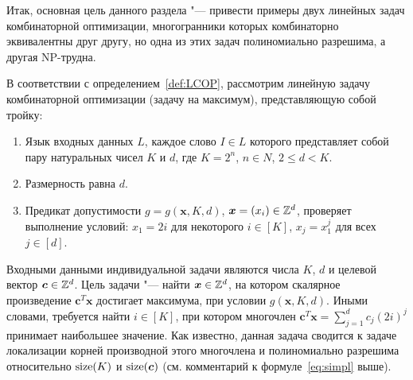 
Итак, основная цель данного раздела "--- привести примеры двух линейных задач комбинаторной оптимизации, %
многогранники которых комбинаторно эквивалентны друг другу, но одна из этих задач полиномиально разрешима, а другая NP-трудна.

В соответствии с определением~\ref{def:LCOP}, рассмотрим линейную задачу комбинаторной оптимизации (задачу на максимум), представляющую собой тройку:
\begin{enumerate}
	\item Язык входных данных $L$, каждое слово $I \in L$ которого представляет собой пару натуральных чисел $K$ и $d$, где $K = 2^n$, $n \in N$, $2 \le d < K$.
	\item Размерность равна $d$.
	\item Предикат допустимости $g = g(\bm{x},K,d)$, $\bm{x} = (x_i) \in \mathbb{Z}^d$, проверяет выполнение условий: $x_1 = 2i$ для некоторого $i \in [K]$, $x_j = x_1^j$ для всех $j \in [d]$.
\end{enumerate}

Входными данными индивидуальной задачи являются числа $K$, $d$ и целевой вектор $\bm{c} \in \mathbb{Z}^d$. Цель задачи "--- найти $\bm{x} \in \mathbb{Z}^d$, на котором скалярное произведение $\bm{c}^T \bm{x}$ достигает максимума, при условии $g(\bm{x},K,d)$.
Иными словами, требуется найти $i \in [K]$, при котором многочлен $\bm{c}^T \bm{x} = \sum_{j=1}^d c_j (2i)^{j}$ принимает наибольшее значение.
Как известно, данная задача сводится к задаче локализации корней производной этого многочлена и полиномиально разрешима относительно $\operatorname{size}(K)$ и $\operatorname{size}(\bm{c})$ (см. комментарий к формуле~\eqref{eq:simpl} выше).

